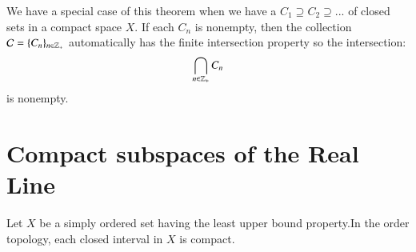 \documentclass[12pt, a4paper, oneside, openright, titlepage]{book}
\begin{document}
We have a special case of this theorem when we have a  $C_1 \supseteq C_2 \supseteq ...$ of closed sets in a compact space $X$. If each $C_n$ is nonempty, then the collection $\mathcal{C} = \{C_n\}_{n\in \mathbb Z_+}$ automatically has the finite intersection property so the intersection: \begin{equation*}
    \bigcap\limits_{n\in\mathbb Z_+}C_n
\end{equation*}
is nonempty.

\section{Compact subspaces of the Real Line}

\begin{thm}
    Let $X$ be a simply ordered set having the least upper bound property.In the order topology, each closed interval in $X$ is compact.
\end{thm}
\end{document}
